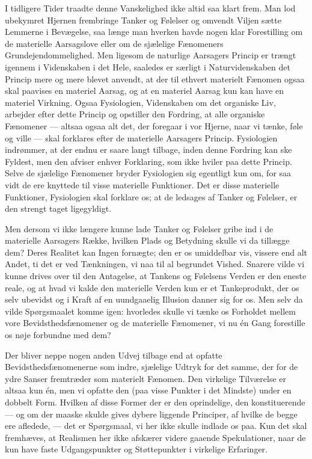 \documentclass[12pt,a4paper]{article}
\newcommand{\opage}[1]{\marginnote{\footnotesize\textit{[#1]}}}
\begin{document}
I tidligere Tider traadte denne Vanskelighed ikke altid saa klart frem.
Man lod ubekymret Hjernen frembringe Tanker og Følelser og omvendt
Viljen sætte Lemmerne i Bevægelse, saa længe man hverken havde nogen
klar Forestilling om de materielle Aarsagslove eller om de sjælelige
Fænomeners Grundejendommelighed. Men ligesom de naturlige Aarsagers
Princip er trængt igennem i Videnskaben i det Hele, saaledes er særligt
i Naturvidenskaben det Princip mere og mere blevet anvendt, at der til
ethvert materielt Fænomen ogsaa skal paavises en materiel Aarsag, og at
en materiel Aarsag kun kan have en materiel Virkning. Ogsaa Fysiologien,
Videnskaben om det organiske Liv, arbejder efter dette Princip og
opstiller den Fordring, at alle organiske Fænomener --- altsaa ogsaa
alt det, der foregaar i vor Hjerne, naar vi tænke, føle og ville ---
skal forklares efter de materielle Aarsagers Princip. Fysiologien
indrømmer, at der endnu er saare langt tilbage, inden denne Fordring kan
ske Fyldest, men den afviser enhver Forklaring, som ikke hviler paa
dette Princip. Selve de sjælelige Fænomener bryder Fysiologien sig
egentligt kun om, for saa vidt de ere knyttede til visse materielle
Funktioner. Det er disse materielle Funktioner, Fysiologien skal forklare
os; at de ledsages af Tanker og Følelser, er den strengt taget ligegyldigt.

Men dersom vi ikke længere kunne lade Tanker og Følelser gribe ind i de
materielle Aarsagers Række, hvilken Plads og Betydning skulle vi da
tillægge dem? Deres Realitet kan Ingen fornægte; den er os umiddelbar
vis, vissere end
\opage{9}alt Andet, ti det er ved Tænkningen, vi naa til al
begrundet Vished. Snarere vilde vi kunne drives over til den Antagelse,
at Tankens og Følelsens Verden er den eneste reale, og at hvad vi kalde
den materielle Verden kun er et Tankeprodukt, der os selv ubevidst og i
Kraft af en uundgaaelig Illusion danner sig for os. Men selv da vilde
Spørgsmaalet komme igen: hvorledes skulle vi tænke os Forholdet mellem
vore Bevidsthedsfænomener og de materielle Fænomener, vi nu én Gang
forestille os nøje forbundne med dem?

Der bliver neppe nogen anden Udvej tilbage end at opfatte
Bevidsthedsfænomenerne som indre, sjælelige Udtryk for det samme, der
for de ydre Sanser fremtræder som materielt Fænomen. Den virkelige
Tilværelse er altsaa kun én, men vi opfatte den (paa visse Punkter i
det Mindste) under en dobbelt Form. Hvilken af disse Former der er den
oprindelige, den konstituerende --- og om der maaske skulde gives dybere
liggende Principer, af hvilke de begge ere afledede, --- det er
Spørgsmaal, vi her ikke skulle indlade os paa. Kun det skal fremhæves,
at Realismen her ikke afskærer videre gaaende Spekulationer, naar de
kun have faste Udgangspunkter og Støttepunkter i virkelige Erfaringer.
\end{document}
